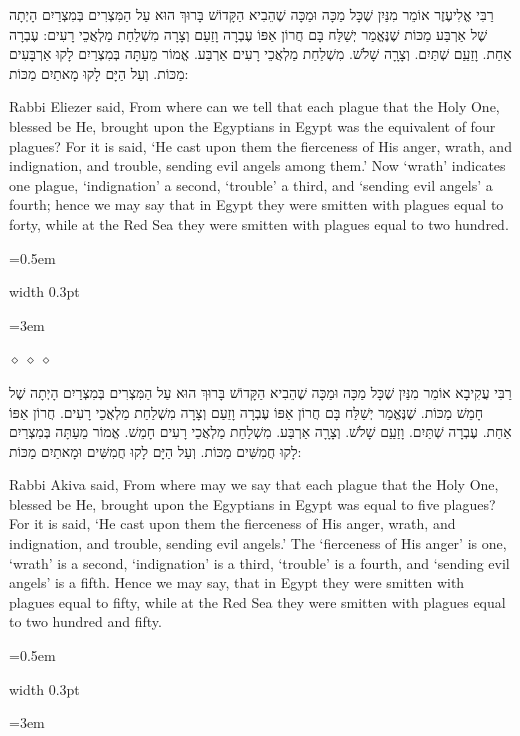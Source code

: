 \documentclass[11pt, openany]{book}
\newcommand{\sederdivider}{%
  \par\vspace{6pt}
  \begin{center}
    \textcolor{sedergold}{\pgfornament[width=1.5cm]{11}}
  \end{center}
  \par\vspace{6pt}
}
\newlength{\bidiHebWidth}
\newlength{\bidiEngWidth}
\newenvironment{bilingual}{%
  \par\vspace{4pt}%
}{%
  \noindent
  \begin{minipage}[t]{\bidiEngWidth}
    \setstretch{1.4}\emergencystretch=0.5em\normalsize
    \usebox{\bidiEngBox}
  \end{minipage}%
  \hfill
  {\color{sedergold}\vrule width 0.3pt}%
  \hfill
  \begin{minipage}[t]{\bidiHebWidth}
    \begingroup\hebrewfont\TeXXeTstate=1\beginR
    \large\setstretch{1.4}\emergencystretch=3em\tolerance=9999\parindent=0pt\relax
    \usebox{\bidiHebBox}
    \endR\endgroup
  \end{minipage}%
  \par\vspace{2pt}%
}
\newenvironment{hebrewcol}{%
  \begin{lrbox}{\bidiHebBox}\begin{minipage}{\bidiHebWidth}%
}{%
  \end{minipage}\end{lrbox}%
}
\newenvironment{englishcol}{%
  \begin{lrbox}{\bidiEngBox}\begin{minipage}{\bidiEngWidth}%
}{%
  \end{minipage}\end{lrbox}%
}
\newcommand{\parasep}{%
  \par\vspace{3pt}
  \begin{center}
    \textcolor{sedergold!50}{\tiny$\diamond\;\diamond\;\diamond$}
  \end{center}
  \par\vspace{3pt}
}
\begin{document}
\begin{bilingual}
\begin{hebrewcol}
רַבִּי אֱלִיעֶזֶר אוֹמֵר מִנַּיִן שֶׁכָּל מַכָּה וּמַכָּה שֶׁהֵבִיא הַקָּדוֹשׁ בָּרוּךְ הוּא עַל הַמִּצְרִים בְּמִצְרַיִם הָיְתָה שֶׁל אַרְבַּע מַכּוֹת שֶׁנֶּאֱמַר יְשַׁלַּח בָּם חֲרוֹן אַפּוֹ עֶבְרָה וָזַעַם וְצָרָה מִשְׁלַחַת מַלְאֲכֵי רָעִים: עֶבְרָה אַחַת. וָזַעַַם שְׁתַּיִם. וְצָרָָה שָׁלֹשׁ. מִשְׁלַחַת מַלְאֲכֵי רָעִים אַרְבַּע. אֱמוֹר מֵעַתָּה בְּמִצְרַיִם לָקוּ אַרְבָּעִים מַכּוֹת. וְעַל הַיָּם לָקוּ מָאתַיִם מַכּוֹת:
\end{hebrewcol}
\begin{englishcol}
Rabbi Eliezer said, From where can we tell  that each plague that the Holy One, blessed be He, brought upon the Egyptians in Egypt was the equivalent of four plagues? For it is said, ‘He cast upon them the fierceness of His anger, wrath, and indignation, and trouble, sending evil angels among them.’ Now ‘wrath’ indicates one plague, ‘indignation’ a second, ‘trouble’ a third, and ‘sending evil angels’ a fourth; hence we may say that in Egypt they were smitten with plagues equal to forty, while at the Red Sea they were smitten with plagues equal to two hundred.
\end{englishcol}
\end{bilingual}
\parasep

\begin{bilingual}
\begin{hebrewcol}
רַבִּי עֲקִיבָא אוֹמֵר מִנַּיִן שֶׁכָּל מַכָּה וּמַכָּה שֶׁהֵבִיא הַקָּדוֹשׁ בָּרוּךְ הוּא עַל הַמִּצְרִים בְּמִצְרַיִם הָיְתָה שֶׁל חָמֵשׁ מַכּוֹת. שֶׁנֶּאֱמַר יְשַׁלַּח בָּם חֲרוֹן אַפּוֹ עֶבְרָה וָזַעַם וְצָרָה מִשְׁלַחַת מַלְאֲכֵי רָעִים. חֲרוֹן אַפּוֹ אַחַת. עֶבְרָה שְׁתַּיִם. וָזַעַַם שָׁלֹשׁ. וְצָרָָה אַרְבַּע. מִשְׁלַחַת מַלְאֲכֵי רָעִים חָמֵשׁ. אֱמוֹר מֵעַתָּה בְּמִצְרַיִם לָקוּ חֲמִשִּׁים מַכּוֹת. וְעַל הַיָּם לָקוּ חֲמִשִּׁים וּמָאתַיִם מַכּוֹת:
\end{hebrewcol}
\begin{englishcol}
Rabbi Akiva said, From where may we say  that each plague that the Holy One, blessed be He, brought upon the Egyptians in Egypt was equal to five plagues? For it is said, ‘He cast upon them the fierceness of His anger, wrath, and indignation, and trouble, sending evil angels.’ The ‘fierceness of His anger’ is one, ‘wrath’ is a second, ‘indignation’ is a third, ‘trouble’ is a fourth, and ‘sending evil angels’ is a fifth. Hence we may say, that in Egypt they were smitten with plagues equal to fifty, while at the Red Sea they were smitten with plagues equal to two hundred and fifty.
\end{englishcol}
\end{bilingual}
\sederdivider
\end{document}
